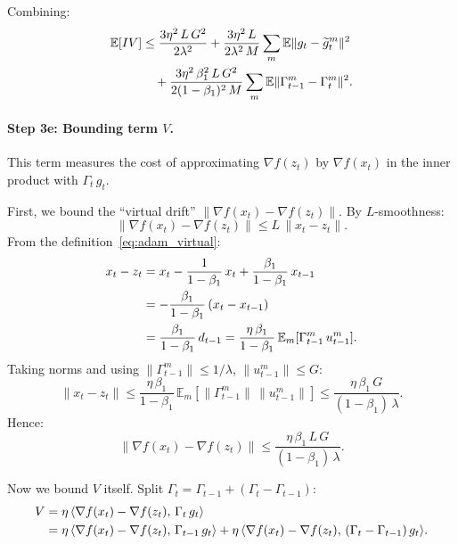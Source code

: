 \documentclass{article}
\begin{document}
Combining:
\begin{align}
\mathbb{E}[IV]
&\leq \frac{3\eta^2\,L\,G^2}{2\lambda^2}
  + \frac{3\eta^2\,L}{2\lambda^2\,M}\sum_m
  \mathbb{E}\|g_t - \widetilde{g}_t^m\|^2 \notag \\
&\quad+ \frac{3\eta^2\,\beta_1^2\,L\,G^2}{2(1-\beta_1)^2\,M}\sum_m
  \mathbb{E}\|\Gamma_{t-1}^m - \Gamma_t^m\|^2.
\label{eq:adam_IV_final}
\end{align}

\paragraph{Step 3e: Bounding term $V$.}

This term measures the cost of approximating $\nabla f(z_t)$ by
$\nabla f(x_t)$ in the inner product with $\Gamma_t\,g_t$.

First, we bound the ``virtual drift'' $\|\nabla f(x_t) - \nabla f(z_t)\|$.
By $L$-smoothness:
\begin{equation}
\|\nabla f(x_t) - \nabla f(z_t)\| \leq L\,\|x_t - z_t\|.
\label{eq:adam_V_smooth}
\end{equation}
From the definition~\eqref{eq:adam_virtual}:
\begin{align}
x_t - z_t
&= x_t - \frac{1}{1-\beta_1}\,x_t + \frac{\beta_1}{1-\beta_1}\,x_{t-1}
\notag \\
&= -\frac{\beta_1}{1-\beta_1}\,(x_t - x_{t-1})
\notag \\
&= \frac{\beta_1}{1-\beta_1}\,d_{t-1}
= \frac{\eta\,\beta_1}{1-\beta_1}\,
\mathbb{E}_m[\Gamma_{t-1}^m\,u_{t-1}^m].
\label{eq:adam_V_xz}
\end{align}
Taking norms and using $\|\Gamma_{t-1}^m\| \leq 1/\lambda$,
$\|u_{t-1}^m\| \leq G$:
\begin{equation}
\|x_t - z_t\|
\leq \frac{\eta\,\beta_1}{1-\beta_1}\,
\mathbb{E}_m[\|\Gamma_{t-1}^m\|\,\|u_{t-1}^m\|]
\leq \frac{\eta\,\beta_1\,G}{(1-\beta_1)\,\lambda}.
\label{eq:adam_V_xz_bound}
\end{equation}
Hence:
\begin{equation}
\|\nabla f(x_t) - \nabla f(z_t)\|
\leq \frac{\eta\,\beta_1\,L\,G}{(1-\beta_1)\,\lambda}.
\label{eq:adam_V_grad_bound}
\end{equation}

Now we bound $V$ itself. Split $\Gamma_t = \Gamma_{t-1} + (\Gamma_t - \Gamma_{t-1})$:
\begin{align}
V &= \eta\,\langle \nabla f(x_t) - \nabla f(z_t),\, \Gamma_t\,g_t \rangle
\notag \\
&= \eta\,\langle \nabla f(x_t) - \nabla f(z_t),\, \Gamma_{t-1}\,g_t \rangle
   + \eta\,\langle \nabla f(x_t) - \nabla f(z_t),\,
   (\Gamma_t - \Gamma_{t-1})\,g_t \rangle.
\label{eq:adam_V_split}
\end{align}
\end{document}
